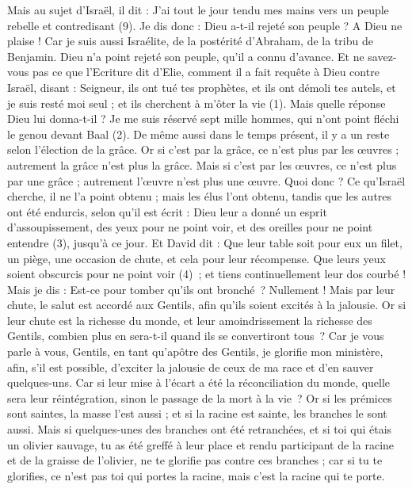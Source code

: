 \begin{multicols}{2}
Mais au sujet d’Israël, il dit : J'ai tout le jour tendu mes mains vers un peuple rebelle et contredisant (9).
\VerseOne{}Je dis donc : Dieu a-t-il rejeté son peuple ? A Dieu ne plaise ! Car je suis aussi Israélite, de la postérité d'Abraham, de la tribu de Benjamin.
Dieu n'a point rejeté son peuple, qu’il a connu d’avance. Et ne savez-vous pas ce que l'Ecriture dit d'Elie, comment il a fait requête à Dieu contre Israël, disant :
Seigneur, ils ont tué tes prophètes, et ils ont démoli tes autels, et je suis resté moi seul ; et ils cherchent à m'ôter la vie (1).
Mais quelle réponse Dieu lui donna-t-il ? Je me suis réservé sept mille hommes, qui n'ont point fléchi le genou devant Baal (2).
De même aussi dans le temps présent, il y a un reste selon l'élection de la grâce.
Or si c'est par la grâce, ce n'est plus par les œuvres ; autrement la grâce n'est plus la grâce. Mais si c'est par les œuvres, ce n'est plus par une grâce ; autrement l’œuvre n'est plus une œuvre.
Quoi donc ? Ce qu'Israël cherche, il ne l'a point obtenu ; mais les élus l’ont obtenu, tandis que les autres ont été endurcis,
selon qu'il est écrit : Dieu leur a donné un esprit d’assoupissement, des yeux pour ne point voir, et des oreilles pour ne point entendre (3), jusqu’à ce jour. Et David dit :
Que leur table soit pour eux un filet, un piège, une occasion de chute, et cela pour leur récompense.
Que leurs yeux soient obscurcis pour ne point voir (4) ; et tiens continuellement leur dos courbé !
Mais je dis : Est-ce pour tomber qu’ils ont bronché ? Nullement ! Mais par leur chute, le salut est accordé aux Gentils, afin qu’ils soient excités à la jalousie.
Or si leur chute est la richesse du monde, et leur amoindrissement la richesse des Gentils, combien plus en sera-t-il quand ils se convertiront tous ?
Car je vous parle à vous, Gentils, en tant qu’apôtre des Gentils, je glorifie mon ministère,
afin, s’il est possible, d’exciter la jalousie de ceux de ma race et d’en sauver quelques-uns.
Car si leur mise à l’écart a été la réconciliation du monde, quelle sera leur réintégration, sinon le passage de la mort à la vie ?
Or si les prémices sont saintes, la masse l'est aussi ; et si la racine est sainte, les branches le sont aussi.
Mais si quelques-unes des branches ont été retranchées, et si toi qui étais un olivier sauvage, tu as été greffé à leur place et rendu participant de la racine et de la graisse de l'olivier,
ne te glorifie pas contre ces branches ; car si tu te glorifies, ce n'est pas toi qui portes la racine, mais c'est la racine qui te porte.

\end{multicols}
